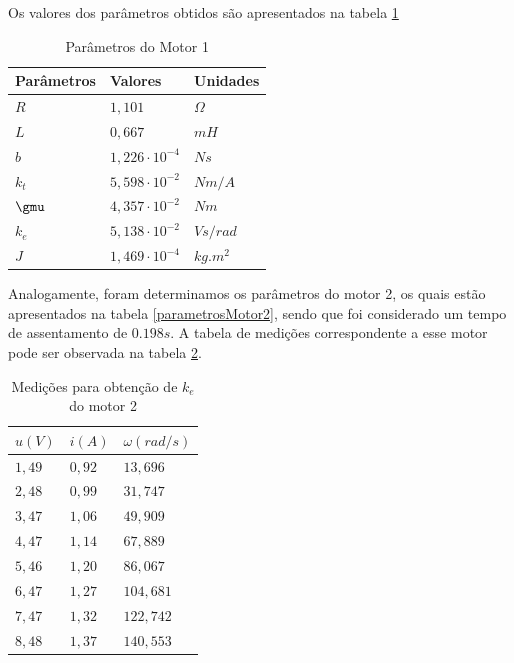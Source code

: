 \documentclass[]{politex}
\begin{document}
Os valores dos parâmetros obtidos são apresentados na tabela \ref{parametrosMotor}

\begin{table}[H] 
\centering
\caption{Parâmetros do Motor 1}
\label{parametrosMotor}
\begin{tabular}{l|l|l}
Parâmetros  & Valores               & Unidades   \\ \hline
$R$         & $1{,}101$               & $\Omega$   \\
$L$         & $0{,}667$               & $mH$       \\
$b$         & $1{,}226 \cdot 10^{-4}$ & $N s$      \\
$k_{t}$     & $5{,}598 \cdot 10^{-2}$ & $Nm/A$     \\
$\gmu$      & $4{,}357 \cdot 10^{-2}$ & $Nm$       \\
$k_{e}$     & $5{,}138 \cdot 10^{-2}$ & $V s/rad$  \\
$J$         & $1{,}469 \cdot 10^{-4}$ & $kg.m^{2}$
\end{tabular}
\end{table} 

Analogamente, foram determinamos os parâmetros do motor 2, os quais estão apresentados na tabela \ref{parametrosMotor2}, sendo que foi considerado um tempo de assentamento de $0.198 s$. A tabela de medições correspondente a esse motor pode ser observada na tabela \ref{MMQke2}.

\begin{table}[H]
\centering
\caption{Medições para obtenção de $k_{e}$ do motor 2}
\label{MMQke2}
\begin{tabular}{l|l|l}
$u(V)$     & $i(A)$    & $\omega(rad/s)$       \\ \hline
$1{,}49$  & $0{,}92$ & $13{,}696$  \\
$2{,}48$  & $0{,}99$ & $31{,}747$  \\
$3{,}47$  & $1{,}06$ & $49{,}909$  \\
$4{,}47$  & $1{,}14$ & $67{,}889$  \\
$5{,}46$  & $1{,}20$ & $86{,}067$ \\
$6{,}47$  & $1{,}27$ & $104{,}681$ \\
$7{,}47$  & $1{,}32$ & $122{,}742$ \\
$8{,}48$  & $1{,}37$ & $140{,}553$
\end{tabular}
\end{table}
\end{document}
